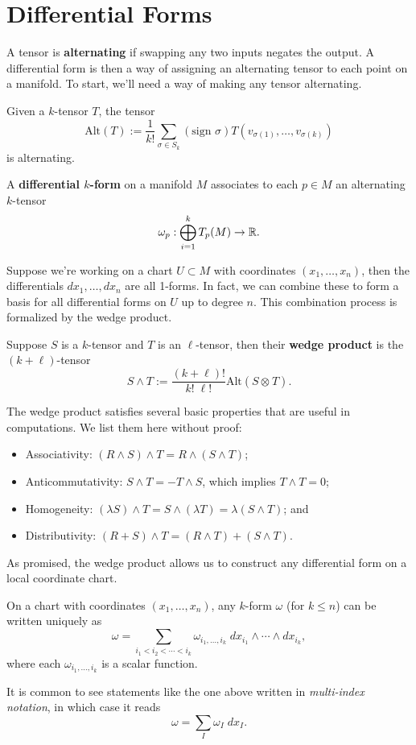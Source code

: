 \documentclass[twoside,10pt]{article}
\begin{document}
\section{Differential Forms}

A tensor is \textbf{alternating} if swapping any two inputs negates the output. A differential form is then a way of assigning an alternating tensor to each point on a manifold. To start, we'll need a way of making any tensor alternating.

\begin{prop}
Given a $k$-tensor $T$, the tensor
\[
	\text{Alt}(T) := \frac{1}{k!} \sum_{\sigma \in S_{k}} (\text{sign } \sigma) T(v_{\sigma(1)}, \dots, v_{\sigma(k)})
\] is alternating.
\end{prop}

\begin{defn}[]
A \textbf{differential $k$-form} on a manifold $M$ associates to each $p \in M$ an alternating $k$-tensor
\[
	\omega_p : \bigoplus_{i=1}^{k} T_{p}(M) \to \mathbb{R}.
\] 
\end{defn}

Suppose we're working on a chart $U \subset M$ with coordinates $(x_1, \dots, x_n)$, then the differentials $dx_1, \dots, dx_n$ are all 1-forms. In fact, we can combine these to form a basis for all differential forms on $U$ up to degree $n$. This combination process is formalized by the wedge product.

\begin{defn}[]
	Suppose $S$ is a $k$-tensor and $T$ is an $\ell$-tensor, then their \textbf{wedge product} is the $(k+\ell)$-tensor
\[
	S \wedge T := \frac{(k+\ell)!}{k! \; \ell!}  \text{Alt}(S \otimes_{}T).
\] 
\end{defn}
The wedge product satisfies several basic properties that are useful in computations. We list them here without proof:
\begin{itemize}
	\item Associativity: $(R \wedge S)\wedge T = R \wedge (S\wedge T)$;
	\item Anticommutativity: $S \wedge T = - T \wedge S$, which implies $T \wedge T = 0$;
	\item Homogeneity: $(\lambda S)\wedge T = S \wedge (\lambda T) = \lambda(S \wedge T)$; and
	\item Distributivity: $(R+S)\wedge T = (R\wedge T) + (S\wedge T)$.
\end{itemize}
As promised, the wedge product allows us to construct any differential form on a local coordinate chart.
\begin{thrm}[]
	On a chart with coordinates $(x_1, \dots, x_n)$, any $k$-form $\omega$ (for $k \leq n$) can be written uniquely as
	\[
		\omega = \sum_{i_1 < i_2 < \cdots < i_k} \omega_{i_1, \dots, i_k} \; dx_{i_1} \wedge \cdots \wedge dx_{i_k},
	\] where each $\omega_{i_1, \dots, i_k}$ is a scalar function.
\end{thrm}
It is common to see statements like the one above written in \textit{multi-index notation}, in which case it reads
\[
\omega = \sum_{I} \omega_I \; dx_I.
\] 
\end{document}
